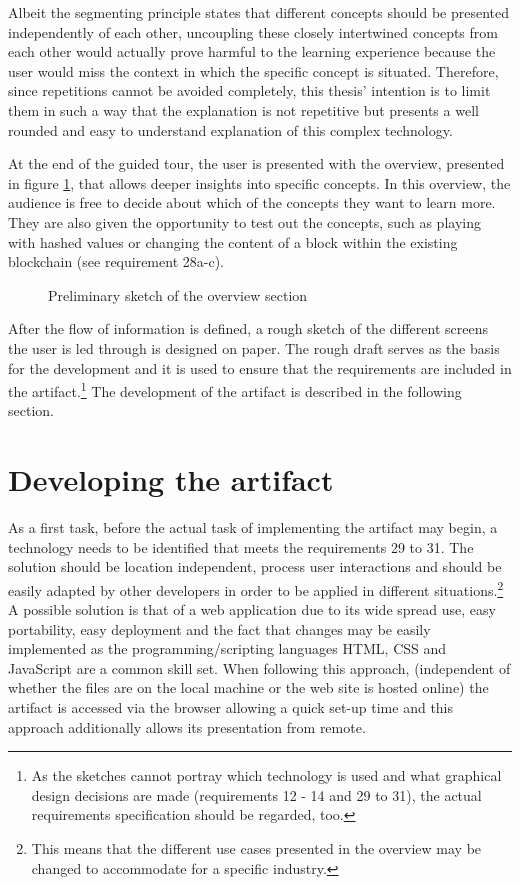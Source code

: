 Albeit the segmenting principle states that different concepts should be presented independently of each other, uncoupling these closely intertwined concepts from each other would actually prove harmful to the learning experience because the user would miss the context in which the specific concept is situated. Therefore, since repetitions cannot be avoided completely, this thesis' intention is to limit them in such a way that the explanation is not repetitive but presents a well rounded and easy to understand explanation of this complex technology.

At the end of the guided tour, the user is presented with the overview, presented in figure \ref{fig:OverviewPic}, that allows deeper insights into specific concepts.
In this overview, the audience is free to decide about which of the concepts they want to learn more. They are also given the opportunity to test out the concepts, such as playing with hashed values or changing the content of a block within the existing blockchain (see requirement 28a-c).

\begin{figure}
    \centering
    
    \caption{Preliminary sketch of the overview section}
    \label{fig:OverviewPic}
\end{figure}

After the flow of information is defined, a rough sketch of the different screens the user is led through is designed on paper. The rough draft serves as the basis for the development and it is used to ensure that the requirements are included in the artifact.\footnote{ As the sketches cannot portray which technology is used and what graphical design decisions are made (requirements 12 - 14 and 29 to 31), the actual requirements specification should be regarded, too.} The development of the artifact is described in the following section.

\section{Developing the artifact}

As a first task, before the actual task of implementing the artifact may begin, a technology needs to be identified that meets the requirements 29 to 31. The solution should be location independent, process user interactions and should be easily adapted by other developers in order to be applied in different situations.\footnote{ This means that the different use cases presented in the overview may be changed to accommodate for a specific industry.} A possible solution is that of a web application due to its wide spread use, easy portability, easy deployment and the fact that changes may be easily implemented as the programming/scripting languages HTML, CSS and JavaScript are a common skill set. When following this approach, (independent of whether the files are on the local machine or the web site is hosted online) the artifact is accessed via the browser allowing a quick set-up time and this approach additionally allows its presentation from remote.



